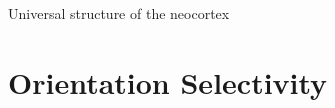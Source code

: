 \documentclass[xcolor=x11names,compress]{beamer}
\renewcommand{\(}{\begin{columns}}
\renewcommand{\)}{\end{columns}}
\newcommand{\<}[1]{\begin{column}{#1}}
\renewcommand{\>}{\end{column}}
\begin{document}
\begin{frame}[t]{Universal structure of the neocortex}
\end{frame}

\section{Orientation Selectivity}
\label{sec:orientation_selectivity}
\end{document}
